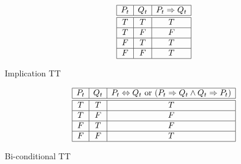 	
\begin{table}[H]

\begin{center}


    
    \begin{minipage}{.5\linewidth}
      
      \centering 
       \begin{displaymath}  %
		  \begin{array}{|c|c|c|}\hline
		    P_t & Q_t & P_t \Rightarrow Q_t \\\hline\hline
		    T & T & T \\\hline
		    T & F & F \\\hline
		    F & T & T \\\hline
		    F & F & T \\\hline
		  \end{array}
		\end{displaymath}
		\caption{Implication TT}
		\label{table:implication_TT}
    \end{minipage}%
    
    
    
    \begin{minipage}{.5\linewidth}
      \centering
        
       \begin{displaymath}  %
		  \begin{array}{|c|c|c|}\hline
		    P_t & Q_t & P_t \Leftrightarrow Q_t \text{ or } (P_t \Rightarrow Q_t \wedge Q_t \Rightarrow P_t) \\\hline\hline
		    T & T & T \\\hline
		    T & F & F \\\hline
		    F & T & F \\\hline
		    F & F & T \\\hline
		  \end{array}
	  \end{displaymath}
	  \caption{Bi-conditional TT}
	  \label{table:biconditional_TT}
    \end{minipage}%

\end{center}    
\end{table}




